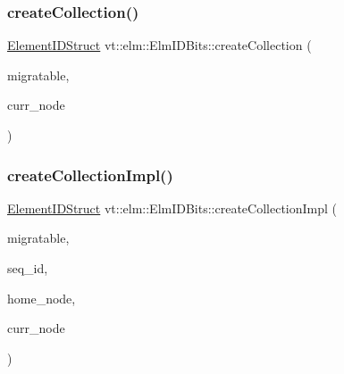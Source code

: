 \mbox{\label{structvt_1_1elm_1_1_elm_i_d_bits_ad5c19f422d984b6011c59babac99127f}} 
\subsubsection{\texorpdfstring{create\+Collection()}{createCollection()}}
{\footnotesize\ttfamily \hyperlink{structvt_1_1elm_1_1_element_i_d_struct}{Element\+I\+D\+Struct} vt\+::elm\+::\+Elm\+I\+D\+Bits\+::create\+Collection (\begin{DoxyParamCaption}\item[{bool}]{migratable,  }\item[{\hyperlink{namespacevt_a866da9d0efc19c0a1ce79e9e492f47e2}{Node\+Type}}]{curr\+\_\+node }\end{DoxyParamCaption})\hspace{0.3cm}{\ttfamily [static]}}

\mbox{\label{structvt_1_1elm_1_1_elm_i_d_bits_a2a29871056e99e94dfe7e411357d1f86}} 
\subsubsection{\texorpdfstring{create\+Collection\+Impl()}{createCollectionImpl()}}
{\footnotesize\ttfamily \hyperlink{structvt_1_1elm_1_1_element_i_d_struct}{Element\+I\+D\+Struct} vt\+::elm\+::\+Elm\+I\+D\+Bits\+::create\+Collection\+Impl (\begin{DoxyParamCaption}\item[{bool}]{migratable,  }\item[{\hyperlink{namespacevt_1_1elm_a63afb64985b41b7b6dcf2f01336391f8}{Element\+I\+D\+Type}}]{seq\+\_\+id,  }\item[{\hyperlink{namespacevt_a866da9d0efc19c0a1ce79e9e492f47e2}{Node\+Type}}]{home\+\_\+node,  }\item[{\hyperlink{namespacevt_a866da9d0efc19c0a1ce79e9e492f47e2}{Node\+Type}}]{curr\+\_\+node }\end{DoxyParamCaption})\hspace{0.3cm}{\ttfamily [static]}}

